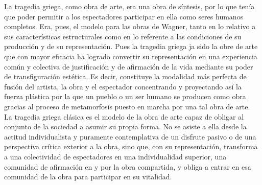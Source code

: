 \documentclass[a4paper, 10pt, twocolumn, spanish]{article}
\begin{document}
La tragedia griega, como obra de arte, era una obra de síntesis, por
lo que tenía que poder permitir a los espectadores participar en ella
como seres humanos completos. Era, pues, el modelo para las obras de
Wagner, tanto en lo relativo a sus características estructurales como
en lo referente a las condiciones de su producción y de su
representación. Pues la tragedia griega ja sido la obre de arte que
con mayor eficacia ha logrado convertir su representación en una
experiencia común y colectiva de justificación y de afirmación de la
vida mediante su poder de transfiguración estética. Es decir,
constituye la modalidad más perfecta de fusión del artista, la obra y
el espectador concentrando y proyectando así la fuerza plástica por la
que un pueblo o un ser humano se producen como obra gracias al proceso
de metamorfosis puesto en marcha por una tal obra de arte.\\[0pt]
La tragedia griega clásica es el modelo de la obra de arte capaz de
obligar al conjunto de la sociedad a asumir su propia forma. No se
asiste a ella desde la actitud individualista y puramente
contemplativa de un disfrute pasivo o de una perspectiva crítica
exterior a la obra, sino que, con su representación, transforma a una
colectividad de espectadores en una individualidad superior, una
comunidad de afirmación en y por la obra compartida, y obliga a entrar
en esa comunidad de la obra para participar en su vitalidad.\\[0pt]
\end{document}
